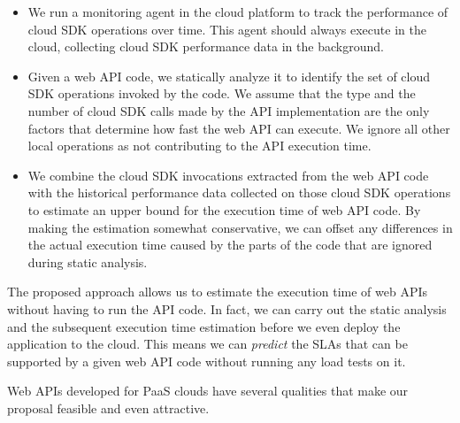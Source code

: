 \begin{itemize}
\item We run a monitoring agent in the cloud platform to track the performance of
cloud SDK operations over time. This agent should always execute in the cloud, collecting
cloud SDK performance data in the background. %
\item Given a web API code, we statically analyze it to identify the set of cloud SDK operations
invoked by the code. We assume that the type and the number of cloud SDK calls made by the API implementation
are the only factors that determine how fast the web API can execute. We ignore all other local operations
as not contributing to the API execution time.
\item We combine the cloud SDK invocations extracted from the web API code with the historical
performance data collected on those cloud SDK operations to estimate an upper bound for the
execution time of web API code. By making the estimation somewhat conservative, we can offset 
any differences in the actual execution time caused by the parts of the code that are ignored during
static analysis. 
\end{itemize}

The proposed approach allows us to estimate the execution time of web APIs without having to
run the API code.
In fact, we can carry out the static analysis and the subsequent execution time
estimation before we even deploy the application to the cloud. 
This means we can \textit{predict} the SLAs that can be supported by a given web API code
without running any load tests on it. 

Web APIs developed for PaaS clouds have several qualities that make our proposal
feasible and even attractive.

